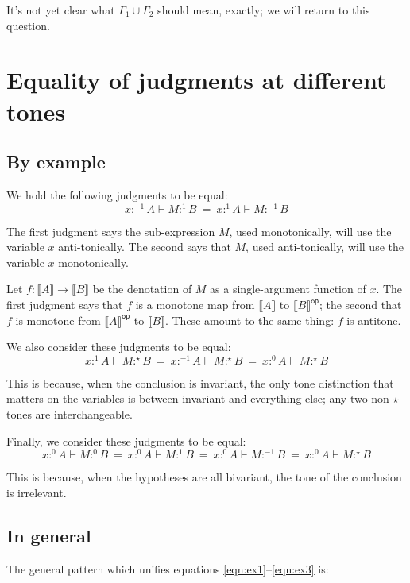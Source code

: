 \documentclass{article}
\newcommand{\todo}[1]{{\color{red}#1}}
\newcommand{\ms}[1]{\ensuremath{\mathsf{#1}}}
\newcommand{\GG}{\Gamma}
\newcommand{\op}{\ms{op}}
\newcommand{\den}[1]{\llbracket{#1}\rrbracket}
\newcommand{\tm}{{\ensuremath{1}}}     %
\newcommand{\ta}{{\ensuremath{-1}}}    %
\newcommand{\ti}{{\ensuremath{\star}}} %
\newcommand{\tb}{{\ensuremath{0}}}     %
\newcommand{\h}[3]{#1 :^{#3}\! {#2}}
\newcommand{\hm}[2]{\h{#1}{#2}{\tm}}
\newcommand{\ha}[2]{\h{#1}{#2}{\ta}}
\newcommand{\hi}[2]{\h{#1}{#2}{\ti}}
\newcommand{\hb}[2]{\h{#1}{#2}{\tb}}
\begin{document}
It's not yet clear what $\GG_1 \cup \GG_2$ should mean, exactly; \todo{we will
  return to this question.}


\section{Equality of judgments at different tones}

\subsection{By example}

We hold the following judgments to be equal:
\begin{equation}\label{eqn:ex1}
 \ha{x}{A} \vdash \hm{M}{B} ~=~ \hm{x}{A} \vdash \ha{M}{B}
\end{equation}

The first judgment says the sub-expression $M$, used monotonically, will use the
variable $x$ anti-tonically. The second says that $M$, used anti-tonically, will
use the variable $x$ monotonically.

Let $f : \den{A} \to \den{B}$ be the denotation of $M$ as a single-argument
function of $x$. The first judgment says that $f$ is a monotone map from
$\den{A}$ to $\den{B}^{\op}$; the second that $f$ is monotone from
$\den{A}^{\op}$ to $\den{B}$. These amount to the same thing: $f$ is
antitone.

We also consider these judgments to be equal:
\begin{equation}
  \hm{x}{A} \vdash \hi{M}{B}
  ~=~
  \ha{x}{A} \vdash \hi{M}{B}
  ~=~
  \hb{x}{A} \vdash \hi{M}{B}
\end{equation}

This is because, when the conclusion is invariant, the only tone distinction
that matters on the variables is between invariant and everything else; any two
non-$\ti$ tones are interchangeable.

Finally, we consider these judgments to be equal:
\begin{equation} \label{eqn:ex3}
  \hb{x}{A} \vdash \hb{M}{B}
  ~=~
  \hb{x}{A} \vdash \hm{M}{B}
  ~=~
  \hb{x}{A} \vdash \ha{M}{B}
  ~=~
  \hb{x}{A} \vdash \hi{M}{B}
\end{equation}

This is because, when the hypotheses are all bivariant, the tone of the
conclusion is irrelevant.


\subsection{In general}
The general pattern which unifies equations \ref{eqn:ex1}--\ref{eqn:ex3} is:
\end{document}

